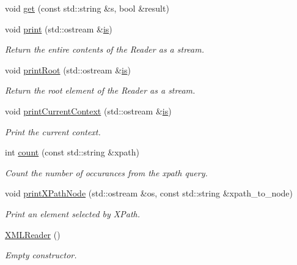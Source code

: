 \begin{DoxyCompactItemize}
\item 
void \mbox{\hyperlink{classADATXML_1_1XMLReader_ae3ba71a241315a5e90ba745fdc7e045b}{get}} (const std\+::string \&s, bool \&result)
\item 
void \mbox{\hyperlink{classADATXML_1_1XMLReader_a72513fe6f299e02428bdf4d225163f50}{print}} (std\+::ostream \&\mbox{\hyperlink{x_8cc_a81abbbdef81e25584a2eab888e643d3d}{is}})
\begin{DoxyCompactList}\small\item\em Return the entire contents of the Reader as a stream. \end{DoxyCompactList}\item 
void \mbox{\hyperlink{classADATXML_1_1XMLReader_a732a08c1605f8c01663105bb3586b575}{print\+Root}} (std\+::ostream \&\mbox{\hyperlink{x_8cc_a81abbbdef81e25584a2eab888e643d3d}{is}})
\begin{DoxyCompactList}\small\item\em Return the root element of the Reader as a stream. \end{DoxyCompactList}\item 
void \mbox{\hyperlink{classADATXML_1_1XMLReader_a424f9e30746b4fdc106b57b5ce95f7ec}{print\+Current\+Context}} (std\+::ostream \&\mbox{\hyperlink{x_8cc_a81abbbdef81e25584a2eab888e643d3d}{is}})
\begin{DoxyCompactList}\small\item\em Print the current context. \end{DoxyCompactList}\item 
int \mbox{\hyperlink{classADATXML_1_1XMLReader_a59584913f1338d956de60adef16a0718}{count}} (const std\+::string \&xpath)
\begin{DoxyCompactList}\small\item\em Count the number of occurances from the xpath query. \end{DoxyCompactList}\item 
void \mbox{\hyperlink{classADATXML_1_1XMLReader_ae1bbeacb282c3e9b33750d36aea11d32}{print\+X\+Path\+Node}} (std\+::ostream \&os, const std\+::string \&xpath\+\_\+to\+\_\+node)
\begin{DoxyCompactList}\small\item\em Print an element selected by X\+Path. \end{DoxyCompactList}\item 
\mbox{\hyperlink{classADATXML_1_1XMLReader_a1934189445871612ae9b93f35e17c468}{X\+M\+L\+Reader}} ()
\begin{DoxyCompactList}\small\item\em Empty constructor. \end{DoxyCompactList}\item 

\end{DoxyCompactItemize}

